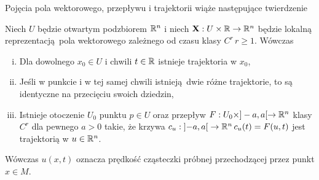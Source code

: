 Pojęcia pola wektorowego, przepływu i trajektorii wiąże następujące twierdzenie

\begin{twierdzenie}
    Niech \(U\) będzie otwartym podzbiorem \(\mathbb{R}^n\) i niech \(\mathbf{X}: U\times \mathbb{R} \rightarrow \mathbb{R}^n\) będzie lokalną reprezentacją pola wektorowego zależnego od czasu klasy \(C^r\, r\geq 1\). Wówczas 
    \begin{enumerate}[i)]
        \item Dla dowolnego \(x_0\in U\) i chwili \(t\in \mathbb{R}\) istnieje trajektoria w \(x_0\),
    \item Jeśli w punkcie i w tej samej chwili istnieją dwie różne trajektorie, to są identyczne na przecięciu swoich dziedzin,
    \item Istnieje otoczenie \(U_0\) punktu \(p\in U\) oraz przepływ \(F: U_0 \times ]-a, a[ \rightarrow \mathbb{R}^n\) klasy \(C^r\) dla pewnego \(a>0\) takie, że krzywa \(c_u: \left]-a, a\right[\rightarrow \mathbb{R}^n\, c_u(t) = F(u, t)\) jest trajektorią w \(u\in \mathbb{R}^n\).
\end{enumerate}
\end{twierdzenie}
Wówczas \(u(x, t)\) oznacza prędkość cząsteczki próbnej przechodzącej przez punkt \(x\in M\). 
